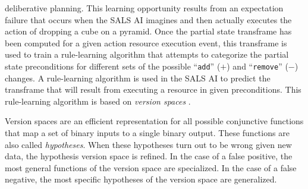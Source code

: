deliberative planning.  This learning opportunity results from an
expectation failure that occurs when the SALS AI imagines and then
actually executes the action of dropping a cube on a pyramid.  Once
the partial state transframe has been computed for a given action
resource execution event, this transframe is used to train a
rule-learning algorithm that attempts to categorize the partial state
preconditions for different sets of the possible ``{\tt{add}}'' ($+$)
and ``{\tt{remove}}'' ($-$) changes.  A rule-learning algorithm is
used in the SALS AI to predict the transframe that will result from
executing a resource in given preconditions.  This rule-learning
algorithm is based on {\emph{version spaces}} \cite[]{mitchell:1997}.

Version spaces are an efficient representation for all possible
conjunctive functions that map a set of binary inputs to a single
binary output.  These functions are also called {\emph{hypotheses}}.
When these hypotheses turn out to be wrong given new data, the
hypothesis version space is refined.  In the case of a false positive,
the most general functions of the version space are specialized.  In
the case of a false negative, the most specific hypotheses of the
version space are generalized.
